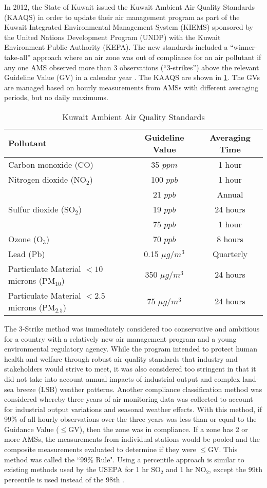 In 2012, the State of Kuwait issued the Kuwait Ambient Air Quality Standards (KAAQS) in order to update their air management program as part of the Kuwait Integrated Environmental Management System (KIEMS) sponsored by the United Nations Development Program (UNDP) with the Kuwait Environment Public Authority (KEPA). The new standards included a ``winner-take-all” approach where an air zone was out of compliance for an air pollutant if any one AMS observed more than 3 observations (``3-strikes”) above the relevant Guideline Value (GV) in a calendar year \citep{KEPA2017}. The KAAQS are shown in \ref{tb:1kaaqs}. The GVs are managed based on hourly measurements from AMSs with different averaging periods, but no daily maximums.
%
\begin{table}[H]
\centering
\caption{Kuwait Ambient Air Quality Standards}
\label{tb:1kaaqs}
\begin{tabular}{@{}lcc@{}}
\toprule
\textbf{Pollutant} & \textbf{Guideline Value} & \textbf{Averaging Time} \\ \midrule
Carbon monoxide (CO) & 35 $ppm$ & 1 hour \\
Nitrogen dioxide (NO$_{2}$) & 100 $ppb$ & 1 hour \\
 & 21 $ppb$ & Annual \\
Sulfur dioxide (SO$_{2}$) & 19 $ppb$ & 24 hours \\
 & 75 $ppb$ & 1 hour \\
Ozone (O$_{3}$) & 70 $ppb$ & 8 hours \\
Lead (Pb) & 0.15 $\mu g/m^{3}$ & Quarterly \\
Particulate Material $<10$ microns (PM$_{10}$) & 350 $\mu g/m^{3}$ & 24 hours \\
Particulate Material $<2.5$ microns (PM$_{2.5}$) & 75 $\mu g/m^{3}$ & 24 hours \\ \bottomrule
\end{tabular}
\end{table}
%
The 3-Strike method was immediately considered too conservative and ambitious for a country with a relatively new air management program and a young environmental regulatory agency. While the program intended to protect human health and welfare through robust air quality standards that industry and stakeholders would strive to meet, it was also considered too stringent in that it did not take into account annual impacts of industrial output and complex land-sea breeze (LSB) weather patterns. Another compliance classification method was considered whereby three years of air monitoring data was collected to account for industrial output variations and seasonal weather effects. With this method, if 99\% of all hourly observations over the three years was less than or equal to the Guidance Value ($\leq$GV), then the zone was in compliance. If a zone has 2 or more AMSs, the measurements from individual stations would be pooled and the composite measurements evaluated to determine if they were $\leq$GV. This method was called the ``99\% Rule". Using a percentile approach is similar to existing methods used by the USEPA for 1 hr SO$_{2}$ and 1 hr NO$_{2}$, except the 99th percentile is used instead of the 98th \citep{USEPA2016a}.
